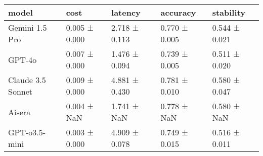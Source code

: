 \begin{tabular}{lllll}
\toprule
model & cost & latency & accuracy & stability \\
\midrule
Gemini 1.5 Pro & 0.005 ± 0.000 & 2.718 ± 0.113 & 0.770 ± 0.005 & 0.544 ± 0.021 \\
GPT-4o & 0.007 ± 0.000 & 1.476 ± 0.094 & 0.739 ± 0.005 & 0.511 ± 0.020 \\
Claude 3.5 Sonnet & 0.009 ± 0.000 & 4.881 ± 0.430 & 0.781 ± 0.010 & 0.580 ± 0.047 \\
Aisera & 0.004 ± NaN & 1.741 ± NaN & 0.778 ± NaN & 0.580 ± NaN \\
GPT-o3.5-mini & 0.003 ± 0.000 & 4.909 ± 0.078 & 0.749 ± 0.015 & 0.516 ± 0.011 \\
\bottomrule
\end{tabular}
